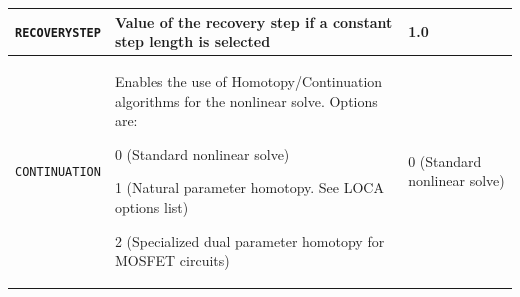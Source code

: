 \begin{longtable}[htbp]{|>{\setlength{\hsize}{.9\hsize}}Y|
>{\setlength{\hsize}{1.2\hsize}}Y|
>{\setlength{\hsize}{.9\hsize}}Y|}
\texttt{RECOVERYSTEP} & Value of the recovery step if a constant step length is selected & 1.0 \\ \hline

\texttt{CONTINUATION} & Enables the use of Homotopy/Continuation algorithms for the nonlinear solve.  Options are:
\begin{XyceItemize}
\item 0 (Standard nonlinear solve)
\item 1 (Natural parameter homotopy.  See LOCA options list)
\item 2 (Specialized dual parameter homotopy for MOSFET circuits)
\end{XyceItemize} & 0 (Standard nonlinear solve) \\ \hline


\end{longtable}

